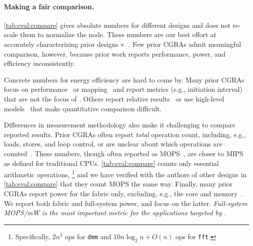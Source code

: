 \paragraph{Making a fair comparison.}
\autoref{tab:eval:compare} gives absolute numbers for different designs and does not re-scale them to normalize the node.
% 
These numbers are our best effort at accurately characterizing prior designs v. \riptide.
%
Few prior CGRAs admit meaningful comparison, however, because prior work reports performance, power, and efficiency inconsistently.

Concrete numbers for energy efficiency are hard to come by.
%
Many prior CGRAs focus on performance~\cite{plasticine,voitsechov2014single} or mapping~\cite{4dcgra,lee2021ultra,himap} and report metrics (e.g., initiation interval) that are not the focus of \riptide.
% 
Others report relative results~\cite{torng2021ultra,nguyen2021fifer} or use high-level models~\cite{weng2020hybrid,nguyen2021fifer} that make quantitative comparison difficult.
%

Differences in measurement methodology also make it challenging to compare reported results.
% 
Prior CGRAs often report \emph{total} operation count, including, e.g., loads, stores, and loop control, or are unclear about which operations are counted~\cite{srp,ipa,cma}.
% 
These numbers, though often reported as MOPS~\cite{srp,ipa}, are closer to MIPS as defined for traditional CPUs.
% 
%
\autoref{tab:eval:compare} counts only essential arithmetic operations,%
\footnote{Specifically, $2n^3$ ops for {\tt dmm} and $10 n \log_2 n + O(n)$ ops for {\tt fft}.}
and we have verified with the authors
of other designs in \autoref{tab:eval:compare} that they count MOPS the same way.
%
Finally, many prior CGRAs report power for the fabric only,
excluding, e.g., the core and memory~\cite{revamp,cma,kim2009hierarchical}.
%
We report both fabric and full-system power, and focus on the latter.
%
\emph{Full-system MOPS/mW is the most important metric for
the applications targeted by \riptide.}

